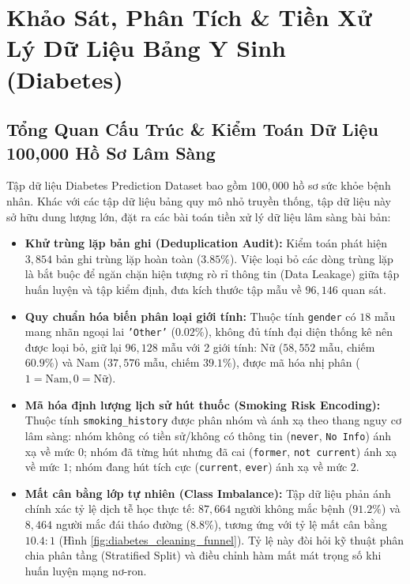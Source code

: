 \documentclass[12pt,a4paper]{report}
\begin{document}
\section{Khảo Sát, Phân Tích \& Tiền Xử Lý Dữ Liệu Bảng Y Sinh (Diabetes)}

\subsection{Tổng Quan Cấu Trúc \& Kiểm Toán Dữ Liệu 100,000 Hồ Sơ Lâm Sàng}
Tập dữ liệu Diabetes Prediction Dataset bao gồm $100,000$ hồ sơ sức khỏe bệnh nhân. Khác với các tập dữ liệu bảng quy mô nhỏ truyền thống, tập dữ liệu này sở hữu dung lượng lớn, đặt ra các bài toán tiền xử lý dữ liệu lâm sàng bài bản:
\begin{itemize}[leftmargin=*]
    \item \textbf{Khử trùng lặp bản ghi (Deduplication Audit):} Kiểm toán phát hiện $3,854$ bản ghi trùng lặp hoàn toàn ($3.85\%$). Việc loại bỏ các dòng trùng lặp là bắt buộc để ngăn chặn hiện tượng rò rỉ thông tin (Data Leakage) giữa tập huấn luyện và tập kiểm định, đưa kích thước tập mẫu về $96,146$ quan sát.
    \item \textbf{Quy chuẩn hóa biến phân loại giới tính:} Thuộc tính \texttt{gender} có $18$ mẫu mang nhãn ngoại lai \texttt{'Other'} ($0.02\%$), không đủ tính đại diện thống kê nên được loại bỏ, giữ lại $96,128$ mẫu với 2 giới tính: Nữ ($58,552$ mẫu, chiếm $60.9\%$) và Nam ($37,576$ mẫu, chiếm $39.1\%$), được mã hóa nhị phân ($1 = \text{Nam}, 0 = \text{Nữ}$).
    \item \textbf{Mã hóa định lượng lịch sử hút thuốc (Smoking Risk Encoding):} Thuộc tính \texttt{smoking\_history} được phân nhóm và ánh xạ theo thang nguy cơ lâm sàng: nhóm không có tiền sử/không có thông tin (\texttt{never}, \texttt{No Info}) ánh xạ về mức $0$; nhóm đã từng hút nhưng đã cai (\texttt{former}, \texttt{not current}) ánh xạ về mức $1$; nhóm đang hút tích cực (\texttt{current}, \texttt{ever}) ánh xạ về mức $2$.
    \item \textbf{Mất cân bằng lớp tự nhiên (Class Imbalance):} Tập dữ liệu phản ánh chính xác tỷ lệ dịch tễ học thực tế: $87,664$ người không mắc bệnh ($91.2\%$) và $8,464$ người mắc đái tháo đường ($8.8\%$), tương ứng với tỷ lệ mất cân bằng $10.4 : 1$ (Hình \ref{fig:diabetes_cleaning_funnel}). Tỷ lệ này đòi hỏi kỹ thuật phân chia phân tầng (Stratified Split) và điều chỉnh hàm mất mát trọng số khi huấn luyện mạng nơ-ron.
\end{itemize}
\end{document}

